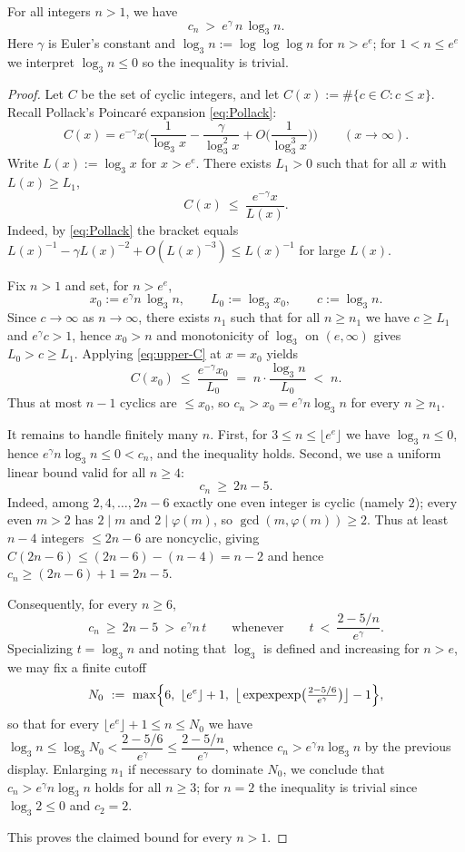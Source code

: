 \begin{theorem}\label{thm:rosser}
For all integers $n>1$, we have
\[
 c_n\ >\ e^{\gamma}\,n\,\log_3 n.
\]
Here $\gamma$ is Euler's constant and $\log_3 n := \log\log\log n$ for $n>e^e$; for $1<n\le e^e$ we interpret $\log_3 n\le0$ so the inequality is trivial.
\end{theorem}

\begin{proof}
Let $C$ be the set of cyclic integers, and let $C(x):=\#\{c\in C:c\le x\}$. Recall Pollack's Poincar\'e expansion \eqref{eq:Pollack}:
\[
 C(x)=e^{-\gamma}x\Big(\frac{1}{\log_3 x}-\frac{\gamma}{\log_3^2 x}+O\Big(\frac{1}{\log_3^3 x}\Big)\Big)\qquad(x\to\infty).
\]
Write $L(x):=\log_3 x$ for $x>e^e$. There exists $L_1>0$ such that for all $x$ with $L(x)\ge L_1$,
\begin{equation}\label{eq:upper-C}
 C(x)\ \le\ \frac{e^{-\gamma}x}{L(x)}.
\end{equation}
Indeed, by \eqref{eq:Pollack} the bracket equals $L(x)^{-1}-\gamma L(x)^{-2}+O(L(x)^{-3})\le L(x)^{-1}$ for large $L(x)$.

Fix $n>1$ and set, for $n>e^e$,
\[
 x_0:=e^{\gamma}n\,\log_3 n,\qquad L_0:=\log_3 x_0,\qquad c:=\log_3 n.
\]
Since $c\to\infty$ as $n\to\infty$, there exists $n_1$ such that for all $n\ge n_1$ we have $c\ge L_1$ and $e^{\gamma}c>1$, hence $x_0>n$ and monotonicity of $\log_3$ on $(e,\infty)$ gives $L_0>c\ge L_1$. Applying \eqref{eq:upper-C} at $x=x_0$ yields
\[
 C(x_0)\ \le\ \frac{e^{-\gamma}x_0}{L_0}
 \;=\; n\cdot\frac{\log_3 n}{L_0}
 \;<\; n.
\]
Thus at most $n-1$ cyclics are $\le x_0$, so $c_n>x_0=e^{\gamma}n\log_3 n$ for every $n\ge n_1$.

It remains to handle finitely many $n$. First, for $3\le n\le \lfloor e^e\rfloor$ we have $\log_3 n\le0$, hence $e^{\gamma}n\log_3 n\le0<c_n$, and the inequality holds. Second, we use a uniform linear bound valid for all $n\ge4$:
\begin{equation}\label{eq:linear-lb}
 c_n\ \ge\ 2n-5.
\end{equation}
Indeed, among $2,4,\dots,2n-6$ exactly one even integer is cyclic (namely $2$); every even $m>2$ has $2\mid m$ and $2\mid\varphi(m)$, so $\gcd(m,\varphi(m))\ge2$. Thus at least $n-4$ integers $\le2n-6$ are noncyclic, giving $C(2n-6)\le (2n-6)-(n-4)=n-2$ and hence $c_n\ge (2n-6)+1=2n-5$.

Consequently, for every $n\ge6$,
\[
 c_n\ \ge\ 2n-5\ >\ e^{\gamma}n\,t\qquad\text{whenever}\qquad t\ <\ \frac{2-5/n}{e^{\gamma}}.
\]
Specializing $t=\log_3 n$ and noting that $\log_3$ is defined and increasing for $n>e$, we may fix a finite cutoff
\[
 N_0\ :=\ \max\Bigl\{6,\ \lfloor e^e\rfloor+1,\ \big\lfloor\exp\!\exp\!\exp\!\big(\tfrac{2-5/6}{e^{\gamma}}\big)\big\rfloor-1\Bigr\},
\]
so that for every $\lfloor e^e\rfloor+1\le n\le N_0$ we have $\log_3 n\le \log_3 N_0<\dfrac{2-5/6}{e^{\gamma}}\le \dfrac{2-5/n}{e^{\gamma}}$, whence $c_n>e^{\gamma}n\log_3 n$ by the previous display. Enlarging $n_1$ if necessary to dominate $N_0$, we conclude that $c_n>e^{\gamma}n\log_3 n$ holds for all $n\ge3$; for $n=2$ the inequality is trivial since $\log_3 2\le0$ and $c_2=2$.

This proves the claimed bound for every $n>1$.
\end{proof}

